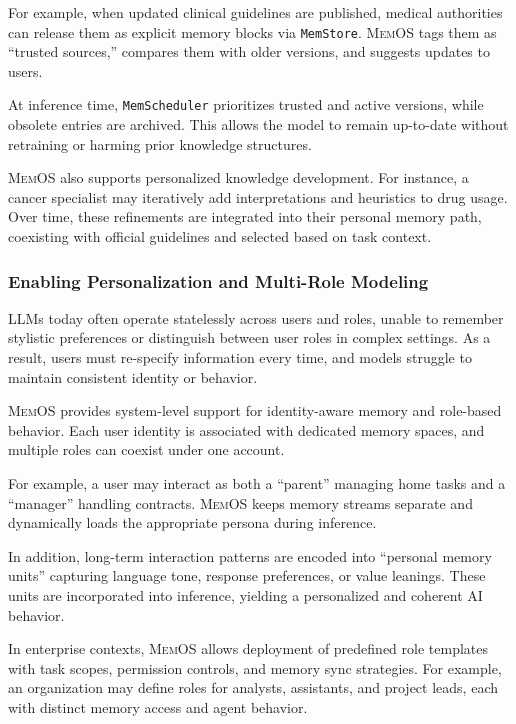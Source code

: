 \documentclass[]{memtensor}
\begin{document}
For example, when updated clinical guidelines are published, medical authorities can release them as explicit memory blocks via \texttt{MemStore}. \textsc{MemOS} tags them as “trusted sources,” compares them with older versions, and suggests updates to users.

At inference time, \texttt{MemScheduler} prioritizes trusted and active versions, while obsolete entries are archived. This allows the model to remain up-to-date without retraining or harming prior knowledge structures.

\textsc{MemOS} also supports personalized knowledge development. For instance, a cancer specialist may iteratively add interpretations and heuristics to drug usage. Over time, these refinements are integrated into their personal memory path, coexisting with official guidelines and selected based on task context.

\subsubsection{Enabling Personalization and Multi-Role Modeling}

LLMs today often operate statelessly across users and roles, unable to remember stylistic preferences or distinguish between user roles in complex settings. As a result, users must re-specify information every time, and models struggle to maintain consistent identity or behavior.

\textsc{MemOS} provides system-level support for identity-aware memory and role-based behavior. Each user identity is associated with dedicated memory spaces, and multiple roles can coexist under one account.

For example, a user may interact as both a “parent” managing home tasks and a “manager” handling contracts. \textsc{MemOS} keeps memory streams separate and dynamically loads the appropriate persona during inference.

In addition, long-term interaction patterns are encoded into “personal memory units” capturing language tone, response preferences, or value leanings. These units are incorporated into inference, yielding a personalized and coherent AI behavior.

In enterprise contexts, \textsc{MemOS} allows deployment of predefined role templates with task scopes, permission controls, and memory sync strategies. For example, an organization may define roles for analysts, assistants, and project leads, each with distinct memory access and agent behavior.
\end{document}
